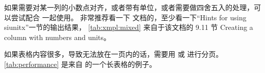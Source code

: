 如果需要对某一列的小数点对齐，或者带有单位，或者需要做四舍五入的处理，可以尝试配合  一起使用。
非常推荐看一下  文档的，至少看一下“Hints for using siunitx”一节的输出结果，
\autoref{tab:xmpl:mixed} 来自于该文档的 9.11 节 Creating a column with numbers and units。

\begin{table}[htb]
  \caption{Tables where numbers have different units}
  \label{tab:xmpl:mixed}
  \hfil
\end{table}

如果表格内容很多，导致无法放在一页内的话，需要用  或  进行分页。
\autoref{tab:performance} 是来自 \cquthesis{} 的一个长表格的例子。

